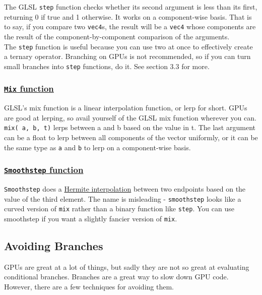 \documentclass{scrartcl}
\begin{document}
The GLSL \texttt{step} function checks whether its second argument is less than its first, returning 0 if true and 1 otherwise. It works on a component-wise basis. That is to say, if you compare two \texttt{vec4}s, the result will be a \texttt{vec4} whose components are the result of the component-by-component comparison of the arguments.\\

The \texttt{step} function is useful because you can use two at once to effectively create a ternary operator. Branching on GPUs is not recommended, so if you can turn small branches into \texttt{step} functions, do it. See section 3.3 for more.

\subsubsection{ \href{https://www.opengl.org/sdk/docs/man/html/mix.xhtml}{\texttt{Mix} function}}

GLSL's mix function is a linear interpolation function, or lerp for short. GPUs are good at lerping, so avail yourself of the GLSL mix function wherever you can.\\

\texttt{mix( a, b, t)} lerps between a and b based on the value in t. The last argument can be a float to lerp between all components of the vector uniformly, or it can be the same type as \texttt{a} and \texttt{b} to lerp on a component-wise basis.

\subsubsection{ \href{https://www.opengl.org/sdk/docs/man/html/smoothstep.xhtml}{\texttt{Smoothstep} function}}

\texttt{Smoothstep} does a \href{http://en.wikipedia.org/wiki/Hermite_interpolation}{Hermite interpolation} between two endpoints based on the value of the third element. The name is misleading - \texttt{smoothstep} looks like a curved version of \texttt{mix} rather than a binary function like \texttt{step}. You can use smoothstep if you want a slightly fancier version of \texttt{mix}.

\subsection{Avoiding Branches}

GPUs are great at a lot of things, but sadly they are not so great at evaluating conditional branches. Branches are a great way to slow down GPU code. However, there are a few techniques for avoiding them.
\end{document}
